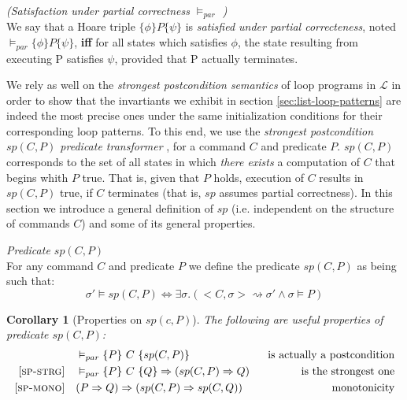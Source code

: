 \documentclass[a4paper,10pt]{article}
\newcommand{\prog}{\ensuremath{\mathcal{L}}\xspace}
\newcommand{\eval}[2]{<#1, #2>}
\newcommand{\sppost}{\textsc{sp-post}\xspace}
\newcommand{\spstrong}{\textsc{sp-strg}\xspace}
\newcommand{\spmonoton}{\textsc{sp-mono}\xspace}
\newtheorem{corollary}[theorem]{Corollary}
\newenvironment{definition}[1][Definition]{\begin{trivlist}
\item[\hskip \labelsep {\bfseries #1}]}{\end{trivlist}}
\newcommand{\spostsym}{\ensuremath{sp}\xspace}
\newcommand{\spost}[2]{\ensuremath{\spostsym(#1,#2)}}
\begin{document}
\begin{definition} \emph{(Satisfaction under partial correctness $\vDash_{par}$ )}\\
We say that a Hoare triple $\{\phi\} P \{ \psi \}$ is \textit{satisfied under partial correcteness}, 
noted $\vDash_{par} \{\phi\} P \{ \psi \}$, \textbf{iff} for all states which satisfies $\phi$, 
the state resulting from executing P satisfies $\psi$, provided that P actually terminates.
\end{definition}

We rely as well on the \textit{strongest postcondition semantics}
\cite{Gannod:1995:SPS:832303.836920} of  loop programs in \prog in order to show that 
the invartiants we exhibit in  section \ref{sec:list-loop-patterns} are indeed the most 
precise ones under the same initialization conditions for their corresponding loop patterns. 
To this end, we use the \textit{strongest postcondition \spost{C}{P}  predicate transformer} 
\cite{dijkstra(scholten:1990}, for a command $C$ and predicate $P$. 
\spost{C}{P}  corresponds to the set of all states in which \textit{there exists} 
a computation of $C$ that begins whith $P$ true. That is, given that $P$ holds, execution of $C$ 
results in \spost{C}{P} true, if $C$ terminates (that is, $sp$ assumes partial correctness).  
In this section we introduce a general definition of $sp$ 
(i.e. independent on the structure of commands $C$) and some of its general properties.\\

\begin{definition} \emph{Predicate \spost{C}{P}}\\
For any command $C$ and predicate $P$ we define the predicate
\spost{C}{P} as being such that:
$$
\sigma' \vDash  \spost{C}{P}  \Leftrightarrow \exists
\sigma. (\eval{C}{\sigma} \rightsquigarrow \sigma' \land \sigma \vDash P)
$$
\end{definition} 

\begin{corollary}[Properties on $sp(c,P)$] The following are useful properties of predicate \spost{C}{P}:
\begin{align*}
[\sppost]  &   \quad \vDash_{par} \{P\} ~C ~ \{ \spost{C}{P} \} & \textnormal{ ~is actually a postcondition} \\
[\spstrong] &  \quad \vDash_{par} \{P\} ~C~ \{ Q\} \Rightarrow (\spost{C}{P} \Rightarrow Q )  & \textnormal{ is the strongest one} \\
[\spmonoton] &   \quad  (P \Rightarrow Q) \Rightarrow (\spost{C}{P} \Rightarrow \spost{C}{Q} ) & \textnormal{ ~monotonicity}\\
\end{align*}
\end{corollary}
\end{document}
